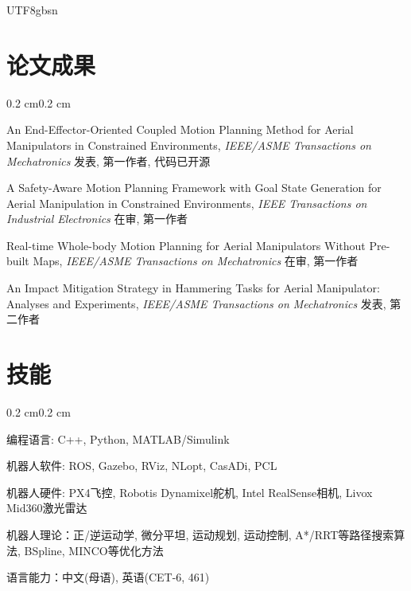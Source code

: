 \documentclass[10pt, letterpaper]{article}
\newenvironment{onecolentry}{
  \begin{adjustwidth}{0.2 cm}{0.2 cm}
}{
  \end{adjustwidth}
}
\begin{document}
\begin{CJK*}{UTF8}{gbsn}
\vspace{-0.3 cm}
\section{论文成果}
\begin{onecolentry}
An End-Effector-Oriented Coupled Motion Planning Method for Aerial Manipulators in Constrained Environments, \textit{IEEE/ASME Transactions on Mechatronics} 发表, 第一作者, 代码已开源

A Safety-Aware Motion Planning Framework with Goal State Generation for Aerial Manipulation in Constrained Environments, \textit{IEEE Transactions on Industrial Electronics} 在审, 第一作者

Real-time Whole-body Motion Planning for Aerial Manipulators Without Pre-built Maps, \textit{IEEE/ASME Transactions on Mechatronics} 在审, 第一作者

An Impact Mitigation Strategy in Hammering Tasks for Aerial Manipulator: Analyses and Experiments, \textit{IEEE/ASME Transactions on Mechatronics} 发表, 第二作者

\end{onecolentry}

\vspace{-0.3 cm}
\section{技能}
\begin{onecolentry}
  编程语言: C++, Python, MATLAB/Simulink
  
  机器人软件: ROS, Gazebo, RViz, NLopt, CasADi, PCL

  机器人硬件: PX4飞控, Robotis Dynamixel舵机, Intel RealSense相机, Livox Mid360激光雷达

  机器人理论：正/逆运动学, 微分平坦, 运动规划, 运动控制, A*/RRT等路径搜索算法, BSpline, MINCO等优化方法

  语言能力：中文(母语), 英语(CET-6, 461)
\end{onecolentry}

\ifPDFTeX%
  \end{CJK*}
\fi
\end{document}
